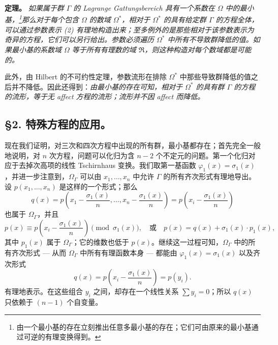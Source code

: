 \smallskip
\noindent\textbf{定理。} \emph{如果属于群 $\Gamma$ 的 Lagrange \emph{Gattungsbereich} 具有一个系数在 $\Omega$ 中的最小基，\footnote{由一个最小基的存在立刻推出任意多最小基的存在；它们可由原来的最小基通过可逆的有理变换得到。}那么对于每个包含 $\Omega$ 的数域 $\Omega^*$，相对于 $\Omega^*$ 的具有给定群 $\Gamma$ 的方程全体，可以通过参数表示 (2) 有理地构造出来；至多例外的是那些相对于该参数表示为奇异的方程，它们可以另行给出。参数必须遍历 $\Omega^*$ 中所有不导致群降低的值。如果最小基的系数域 $\Omega$ 等于所有有理数的域 $\mathfrak R$，则这种构造对每个数域都是可能的。}

此外，由 Hilbert 的不可约性定理，参数流形在排除 $\Omega^*$ 中那些导致群降低的值之后并不降低。因此还得到：\emph{由最小基的存在可知，相对于 $\Omega^*$ 的具有群 $\Gamma$ 的方程的流形，等于无 affect 方程的流形；流形并不因 affect 而降低。}

\subsection*{\S 2. 特殊方程的应用。}

现在我们证明，对三次和四次方程中出现的所有群，最小基都存在；首先完全一般地说明，对 $n$ 次方程，问题可以化归为含 $n-2$ 个不定元的问题。第一个化归对应于去掉次高项的线性 Tschirnhaus 变换。我们取第一基函数 $\varphi_1(x)=\sigma_1(x)$，并进一步注意到，$\Omega_\Gamma$ 可以由 $x_1,
\ldots,x_n$ 中允许 $\Gamma$ 的所有齐次形式有理地导出。设 $p(x_1,
\ldots,x_n)$ 是这样的一个形式；那么
\[
q(x)=p\left(x_1-\frac{\sigma_1(x)}{n},\ldots,x_n-\frac{\sigma_1(x)}{n}\right)=p\left(x_i-\frac{\sigma_1(x)}{n}\right)
\]
也属于 $\Omega_\Gamma$，并且
\[
p(x)\equiv p\left(x_i-\frac{\sigma_1(x)}{n}\right)\pmod{\sigma_1(x)},
\quad\text{或}\quad
p(x)=q(x)+\sigma_1(x)\cdot p_1(x),
\]
其中 $p_1(x)$ 属于 $\Omega_\Gamma$；它的维数也低于 $p(x)$。继续这一过程可知，$\Omega_\Gamma$ 中的所有齐次形式 --- 从而 $\Omega_\Gamma$ 中所有有理函数本身 --- 都能由 $\varphi_1(x)=\sigma_1(x)$ 以及齐次形式
\[
q(x)=p\left(x_i-\frac{\sigma_1(x)}{n}\right)=p(y_i).
\]
有理地表示。在这些组合 $y_i$ 之间，却存在一个线性关系 $\sum y_i=0$；所以 $q(x)$ 只依赖于 $(n-1)$ 个自变量。

